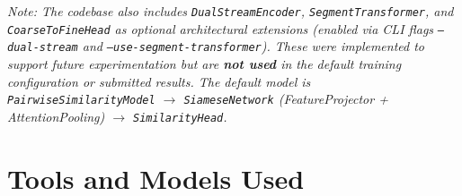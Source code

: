 \documentclass[11pt,a4paper]{article}
\begin{document}
\noindent
\textit{Note: The codebase also includes \texttt{DualStreamEncoder}, \texttt{SegmentTransformer}, and \texttt{CoarseToFineHead} as optional architectural extensions (enabled via CLI flags \texttt{--dual-stream} and \texttt{--use-segment-transformer}). These were implemented to support future experimentation but are \textbf{not used} in the default training configuration or submitted results. The default model is \texttt{PairwiseSimilarityModel} $\to$ \texttt{SiameseNetwork} (FeatureProjector + AttentionPooling) $\to$ \texttt{SimilarityHead}.}


\section{Tools and Models Used}
\end{document}
